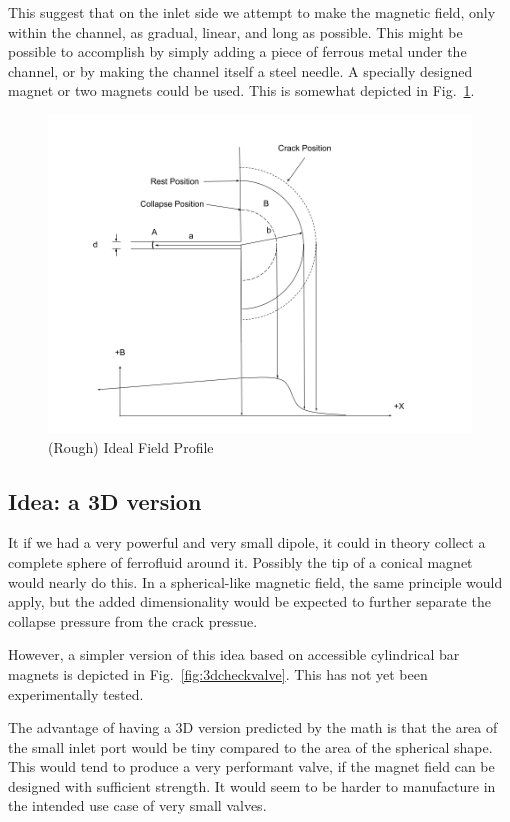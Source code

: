 \documentclass{asme2ej}
\begin{document}
This suggest that on the inlet side we attempt to make
the magnetic field, only within the channel, as gradual, linear, and
long as possible. This might be possible to accomplish by simply adding
a piece of ferrous metal under the channel, or by making the channel
itself a steel needle. A specially designed magnet or two magnets could be
used. This is somewhat depicted in Fig.~\ref{fig:ifp}.

\begin{figure}
\centerline{\includegraphics[width=6in]{figure/IdealFieldProfile.png}}
\caption{(Rough) Ideal Field Profile}
\label{fig:ifp}
\end{figure}


\subsection{Idea: a 3D version}

It if we had a very powerful and very small dipole, it could in theory
collect a complete sphere of ferrofluid around it. Possibly the tip
of a conical magnet would nearly do this.
In a spherical-like magnetic field, the same principle would
apply, but the added dimensionality would be expected to further
separate the collapse pressure from the crack pressue.

However, a simpler version of this idea based on accessible
cylindrical bar magnets is depicted in Fig.~\ref{fig:3dcheckvalve}.
This has not yet been experimentally tested.

The advantage of having a 3D version predicted by the math is that the area
of the small inlet port would be tiny compared to the area of the spherical
shape. This would tend to produce a very performant valve, if the magnet
field can be designed with sufficient strength. It would seem to be harder
to manufacture in the intended use case of very small valves.
\end{document}
